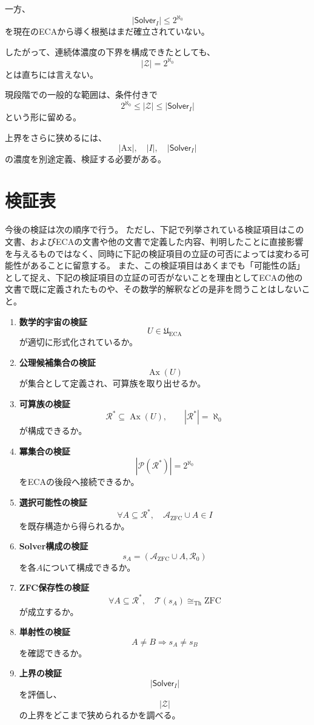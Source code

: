 \documentclass[a4paper,11pt]{article}
\newcommand{\Ax}{\mathrm{Ax}}
\newcommand{\Solver}{\mathsf{Solver}}
\newcommand{\ZFC}{\mathrm{ZFC}}
\begin{document}
一方、
\[
|\Solver_I|\le2^{\aleph_0}
\]
を現在のECAから導く根拠はまだ確立されていない。

したがって、連続体濃度の下界を構成できたとしても、
\[
|\mathcal{Z}|=2^{\aleph_0}
\]
とは直ちには言えない。

現段階での一般的な範囲は、条件付きで
\[
\boxed{
2^{\aleph_0}
\le
|\mathcal{Z}|
\le
|\Solver_I|
}
\]
という形に留める。

上界をさらに狭めるには、
\[
|\Ax|,\quad |I|,\quad |\Solver_I|
\]
の濃度を別途定義、検証する必要がある。

\section{検証表}

今後の検証は次の順序で行う。
ただし、下記で列挙されている検証項目はこの文書、およびECAの文書や他の文書で定義した内容、判明したことに直接影響を与えるものではなく、同時に下記の検証項目の立証の可否によっては変わる可能性があることに留意する。
また、この検証項目はあくまでも「可能性の話」として捉え、下記の検証項目の立証の可否がないことを理由としてECAの他の文書で既に定義されたものや、その数学的解釈などの是非を問うことはしないこと。

\begin{enumerate}
  \item \textbf{数学的宇宙の検証}
  \[
  U\in\mathfrak U_{\mathrm{ECA}}
  \]
  が適切に形式化されているか。

  \item \textbf{公理候補集合の検証}
  \[
  \operatorname{Ax}(U)
  \]
  が集合として定義され、可算族を取り出せるか。

  \item \textbf{可算族の検証}
  \[
  \mathcal{R}^*\subseteq\operatorname{Ax}(U),
  \qquad
  |\mathcal{R}^*|=\aleph_0
  \]
  が構成できるか。

  \item \textbf{冪集合の検証}
  \[
  |\mathcal{P}(\mathcal{R}^*)|=2^{\aleph_0}
  \]
  をECAの後段へ接続できるか。

  \item \textbf{選択可能性の検証}
  \[
  \forall A\subseteq\mathcal{R}^*,
  \quad
  \mathcal{A}_{\mathrm{ZFC}}\cup A\in I
  \]
  を既存構造から得られるか。

  \item \textbf{Solver構成の検証}
  \[
  s_A=(\mathcal{A}_{\mathrm{ZFC}}\cup A,\mathcal{R}_0)
  \]
  を各$A$について構成できるか。

  \item \textbf{ZFC保存性の検証}
  \[
  \forall A\subseteq\mathcal{R}^*,
  \quad
  \mathcal{T}(s_A)\cong_{\mathrm{Th}}\ZFC
  \]
  が成立するか。

  \item \textbf{単射性の検証}
  \[
  A\neq B\Longrightarrow s_A\neq s_B
  \]
  を確認できるか。

  \item \textbf{上界の検証}
  \[
  |\Solver_I|
  \]
  を評価し、
  \[
  |\mathcal{Z}|
  \]
  の上界をどこまで狭められるかを調べる。
\end{enumerate}
\end{document}
